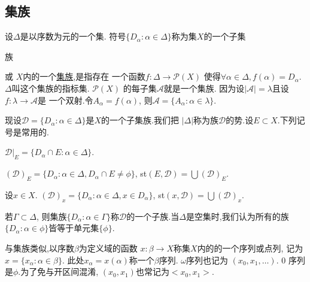 \documentclass[main.tex]{subfiles}
\begin{document}
\subsection{集族}\label{ch1.1.1}
设$\Delta$是以序数为元的一个集.
符号$\{D_\alpha : \alpha\in\Delta\}$称为集$X$的一个子集\begin{kaishu}族\end{kaishu}或
$X$内的一个\underline{集族},是指存在
一个函数$f:\Delta \to \mathscr{P}(X)$
使得$\forall \alpha \in \Delta, f(\alpha)=D_\alpha$.
$\Delta$叫这个集族的指标集. $\mathscr{P}(X)$
的每子集$\mathscr{A}$就是一个集族.
因为设$|\mathscr{A}|=\lambda$且设$f: \lambda\to \mathscr{A}$是
一个双射.令$A_\alpha = f(\alpha)$, 则$\mathscr{A}=\{A_\alpha:\alpha\in\lambda\}$.

现设$\mathscr{D}=\{D_\alpha:\alpha\in\Delta\}$是$X$的一个子集族.我们把
$|\Delta|$称为族$\mathscr{D}$的势.设$E\subset X$.下列记号是常用的.

$\mathscr{D}|_E= \{D_\alpha\cap E: \alpha\in\Delta\}$.

$(\mathscr{D})_E= \{D_\alpha: \alpha\in\Delta, D_\alpha\cap E \ne\phi\}$,
st$(E, \mathscr{D}) = \bigcup(\mathscr{D})_E$.

设$x\in X$. $(\mathscr{D})_x= \{D_\alpha: \alpha\in\Delta, x\in D_\alpha\}$,
st$(x, \mathscr{D}) = \bigcup(\mathscr{D})_x$.

若$\Gamma\subset\Delta$, 则集族$\{D_\alpha : \alpha\in\Gamma\}$称$\mathscr{D}$的一个子族.当$\Delta$是空集时,我们认为所有的族$\{D_\alpha : \alpha\in\phi\}$皆等于单元集$\{\phi\}$.

与集族类似,以序数$\beta$为定义域的函数
$x: \beta\to X$称集$X$内的的一个序列或点列, 记为$x=\{x_\alpha : \alpha\in\beta\}$.
此处$x_\alpha=x(\alpha)$称一个$\beta$序列. $\omega$序列也记为
$(x_0, x_1, \dots)$. 0 序列是$\phi$.为了免与开区间混淆, $(x_0, x_1)$也常记为$<x_0, x_1>$.

\end{document}
